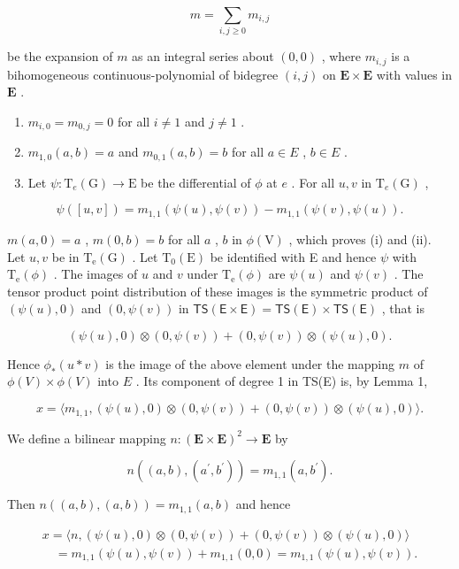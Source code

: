 \[
m = \sum_ {i, j \geqslant 0} m _ {i, j}
\]

be the expansion of \(m\) as an integral series about \((0,0)\) , where \(m_{i,j}\) is a bihomogeneous continuous-polynomial of bidegree \((i,j)\) on \(\mathbf{E} \times \mathbf{E}\) with values in \(\mathbf{E}\) .

\begin{enumerate}
\def\labelenumi{(\roman{enumi})}
\item
  \(m_{i,0} = m_{0,j} = 0\) for all \(i \neq 1\) and \(j \neq 1\) .
\item
  \(m_{1,0}(a,b)=a\) and \(m_{0,1}(a,b)=b\) for all \(a\in E\) , \(b\in E\) .
\item
  Let \(\psi: \mathrm{T}_e(\mathrm{G}) \to \mathrm{E}\) be the differential of \(\phi\) at \(e\) . For all \(u, v\) in \(\mathrm{T}_e(\mathrm{G})\) ,
\end{enumerate}

\[
\psi ([ u, v ]) = m _ {1, 1} (\psi (u), \psi (v)) - m _ {1, 1} (\psi (v), \psi (u)).
\]

\(m(a,0) = a\) , \(m(0,b) = b\) for all \(a\) , \(b\) in \(\phi (\mathrm{V})\) , which proves (i) and (ii). Let \(u, v\) be in \(\mathrm{T_e(G)}\) . Let \(\mathrm{T_0(E)}\) be identified with E and hence \(\psi\) with \(\mathrm{T_e}(\phi)\) . The images of \(u\) and \(v\) under \(\mathrm{T_e}(\phi)\) are \(\psi (u)\) and \(\psi (v)\) . The tensor product point distribution of these images is the symmetric product of \((\psi(u),0)\) and \((0,\psi (v))\) in \(\mathsf{TS(E\times E)} = \mathsf{TS(E)}\times \mathsf{TS(E)}\) , that is

\[
(\psi (u), 0) \otimes (0, \psi (v)) + (0, \psi (v)) \otimes (\psi (u), 0).
\]

Hence \(\phi_{*} (u * v)\) is the image of the above element under the mapping \(m\) of \(\phi(V) \times \phi(V)\) into \(E\) . Its component of degree 1 in TS(E) is, by Lemma 1,

\[
x = \langle m _ {1, 1}, (\psi (u), 0) \otimes (0, \psi (v)) + (0, \psi (v)) \otimes (\psi (u), 0) \rangle .
\]

We define a bilinear mapping \(n\colon (\mathbf{E}\times \mathbf{E})^2\to \mathbf{E}\) by

\[
n ((a, b), (a ^ {\prime}, b ^ {\prime})) = m _ {1, 1} (a, b ^ {\prime}).
\]

Then \(n((a, b), (a, b)) = m_{1,1}(a, b)\) and hence

\[
\begin{array}{l} x = \langle n, (\psi (u), 0) \otimes (0, \psi (v)) + (0, \psi (v)) \otimes (\psi (u), 0) \rangle \\ \quad = m _ {1, 1} (\psi (u), \psi (v)) + m _ {1, 1} (0, 0) = m _ {1, 1} (\psi (u), \psi (v)). \end{array}
\]


